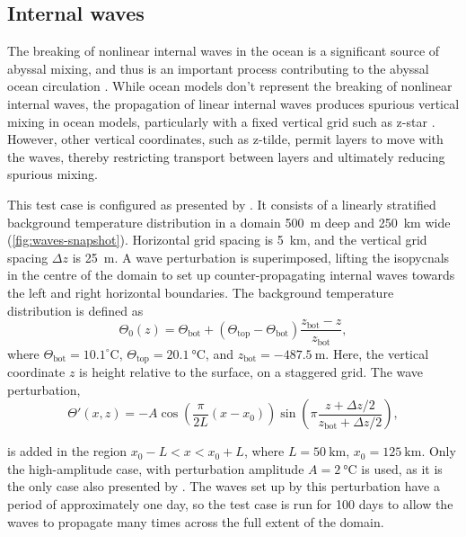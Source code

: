 \subsection{Internal waves}

The breaking of nonlinear internal waves in the ocean is a significant source of abyssal mixing, and thus is an important process contributing to the abyssal ocean circulation \citep{nikurashin13}. While ocean models don't represent the breaking of nonlinear internal waves, the propagation of linear internal waves produces spurious vertical mixing in ocean models, particularly with a fixed vertical grid such as z-star \citep{gouillon10}. However, other vertical coordinates, such as z-tilde, permit layers to move with the waves, thereby restricting transport between layers and ultimately reducing spurious mixing.

This test case is configured as presented by \citet{ilicak12}. It consists of a linearly stratified background temperature distribution in a domain \SI{500}{\metre} deep and \SI{250}{\kilo\metre} wide (\cref{fig:waves-snapshot}). Horizontal grid spacing is \SI{5}{\kilo\metre}, and the vertical grid spacing $\Delta z$ is \SI{25}{\metre}. A wave perturbation is superimposed, lifting the isopycnals in the centre of the domain to set up counter-propagating internal waves towards the left and right horizontal boundaries. The background temperature distribution is defined as
%
\begin{equation}
  \Theta_0(z) = \Theta_\text{bot} + (\Theta_\text{top} - \Theta_\text{bot})\frac{z_\text{bot} - z}{z_\text{bot}},
\end{equation}
%
where $\Theta_\text{bot} = 10.1^\circ\mathrm{C}$, $\Theta_\text{top} = \SI{20.1}{\celsius}$, and $z_\text{bot} = \SI{-487.5}{\metre}$. Here, the vertical coordinate $z$ is height relative to the surface, on a staggered grid. The wave perturbation,
%
\begin{equation}
  \Theta'(x,z) = -A\cos\left(\frac{\pi}{2L}(x - x_0)\right) \sin\left(\pi\frac{z + \Delta z/2}{z_\text{bot} + \Delta z/2}\right),
\end{equation}

is added in the region $x_0 - L < x < x_0 + L$, where $L = \SI{50}{\kilo\metre}$, $x_0 = \SI{125}{\kilo\metre}$. Only the high-amplitude case, with perturbation amplitude $A = \SI{2}{\celsius}$ is used, as it is the only case also presented by \citet{petersen15}. The waves set up by this perturbation have a period of approximately one day, so the test case is run for 100 days to allow the waves to propagate many times across the full extent of the domain.

